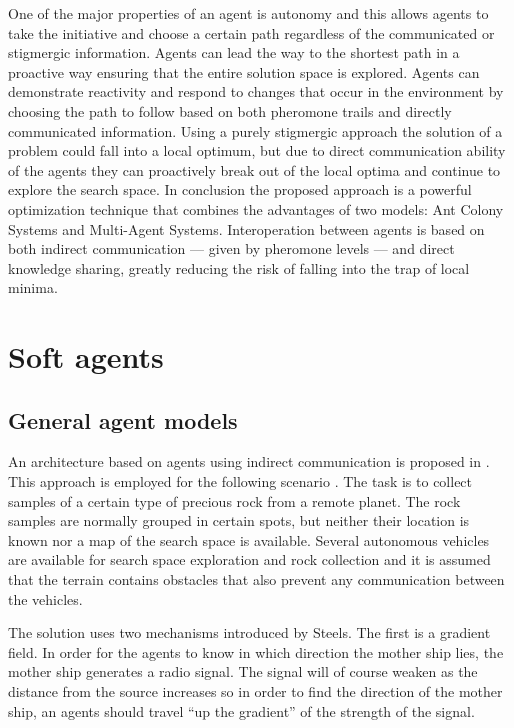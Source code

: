 One of the major properties of an agent is autonomy and this allows agents to take the initiative and choose a certain path regardless of the communicated or stigmergic information. Agents can lead the way to the shortest path in a proactive way ensuring that the entire solution space is explored. Agents can demonstrate reactivity and respond to changes that occur in the environment by choosing the path to follow based on both pheromone trails and directly communicated information. 
Using a purely stigmergic approach the solution of a problem could fall into a local optimum, but due to direct communication ability of the agents they can proactively break out of the local optima and continue to explore the search space.
In conclusion the proposed approach is a powerful optimization technique that
combines the advantages of two models: Ant Colony Systems and
Multi-Agent Systems. Interoperation between agents is based on both
indirect communication --- given by pheromone levels ---  and direct
knowledge sharing, greatly reducing the risk of falling into the
trap of local minima.

\section{Soft agents}
\label{sec:softagents}

\subsection{General agent models}


An architecture based on agents using indirect communication is proposed in \cite{Steels90Components}. This approach is employed for the following scenario \cite{Wooldridge09AnIntroduction}. 
The task is to collect samples of a certain type of precious rock from a remote planet.
The rock samples are normally grouped in certain spots, but neither their location is known nor a map of the search space is available. Several autonomous vehicles are available for search space exploration and rock collection and it is assumed that the terrain contains obstacles that also prevent any communication between the vehicles. 

The solution uses two mechanisms introduced by Steels. The first is a gradient field. In order for the agents to know in which direction the mother ship lies, the mother ship generates a radio signal. The signal will of course weaken as the distance from the source increases so in order to find the direction of the mother ship, an agents should travel ``up the gradient'' of the strength of the signal. 


